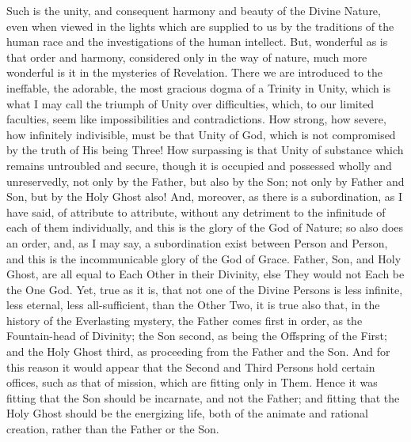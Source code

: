 Such is the unity, and consequent harmony and beauty
of the Divine Nature, even when viewed in the lights
which are supplied to us by the traditions of the human
race and the investigations of the human intellect. But,
wonderful as is that order and harmony, considered only
in the way of nature, much more wonderful is it in the
mysteries of Revelation. There we are introduced to the
ineffable, the adorable, the most gracious dogma of a
Trinity in Unity, which is what I may call the triumph of
Unity over difficulties, which, to our limited faculties,
seem like impossibilities and contradictions. How strong, how severe, how infinitely indivisible, must be that
Unity of God, which is not compromised by the truth of
His being Three! How surpassing is that Unity of
substance which remains untroubled and secure, though it
is occupied and possessed wholly and unreservedly, not
only by the Father, but also by the Son; not only by
Father and Son, but by the Holy Ghost also! And,
moreover, as there is a subordination, as I have said, of
attribute to attribute, without any detriment to the
infinitude of each of them individually, and this is the
glory of the God of Nature; so also does an order, and,
as I may say, a subordination exist between Person and
Person, and this is the incommunicable glory of the God
of Grace. Father, Son, and Holy Ghost, are all equal to
Each Other in their Divinity, else They would not Each be
the One God. Yet, true as it is, that not one of the
Divine Persons is less infinite, less eternal, less
all-sufficient, than the Other Two, it is true also that,
in the history of the Everlasting mystery, the Father
comes first in order, as the Fountain-head of Divinity;
the Son second, as being the Offspring of the First; and
the Holy Ghost third, as proceeding from the Father and
the Son. And for this reason it would appear that the
Second and Third Persons hold certain offices, such as
that of mission, which are fitting only in Them. Hence it
was fitting that the Son should be incarnate, and not the
Father; and fitting that the Holy Ghost should be the
energizing life, both of the animate and rational
creation, rather than the Father or the Son.

